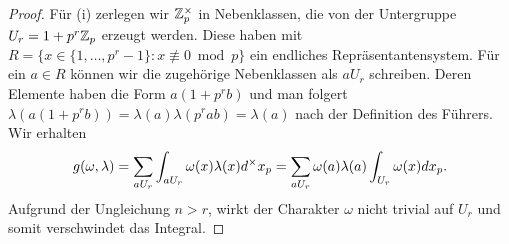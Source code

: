 	\begin{proof}
		Für (i) zerlegen wir $\mathbb{Z}_p^\times$ in Nebenklassen, die von der Untergruppe $U_r=1+p^r{\mathbb{Z}_p}$ erzeugt werden.
		Diese haben mit $R=\{x \in \{ 1,\dots,p^{r}-1\}: x \not\equiv 0 \bmod{p}\}$ ein endliches Repräsentantensystem.
		Für ein $a \in R$ können wir die zugehörige Nebenklassen als $aU_r$ schreiben.
		Deren Elemente haben die Form $a(1+p^rb)$ und man folgert $\lambda(a(1+p^rb)) = \lambda(a)\lambda(p^rab) = \lambda(a)$ nach der Definition des Führers.
		Wir erhalten
		\begin{align*}
			g(\omega,\lambda) = \sum_{aU_r} \int_{aU_r} \omega(x)\lambda(x) d^\times {x}_p = \sum_{aU_r} \omega(a)\lambda(a) \int_{U_r} \omega(x)d{x}_p.
		\end{align*}
		Aufgrund der Ungleichung $n>r$, wirkt der Charakter $\omega$ nicht trivial auf $U_r$ und somit verschwindet das Integral.
		

\end{proof}
